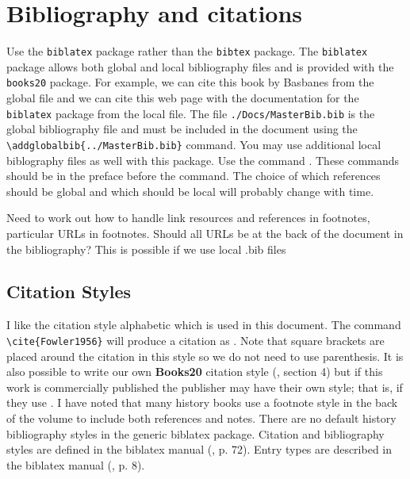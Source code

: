 

\section{Bibliography and citations}

Use the \texttt{biblatex} package \cite{Kime2019} rather than the
\texttt{bibtex} package. The \texttt{biblatex} package allows both
global and local bibliography files and is provided with the
\texttt{books20} package.  For example, we can cite this book by
Basbanes \cite{Basbanes2003} from the global file and we can cite this
web page with the documentation for the \texttt{biblatex} package
\cite{Lehman2018} from the local file. The file
\texttt{./Docs/MasterBib.bib} is the global bibliography file and must
be included in the document using the
\verb|\addglobalbib{../MasterBib.bib}| command. You may use additional
local biblography files as well with this package. Use the command
\verb||. These commands should be in the
preface before the \verb|| command. The choice of
which references should be global and which should be local will
probably change with time.
  
Need to work out how to handle link resources and references in
footnotes, particular URLs in footnotes. Should all URLs be at the
back of the document in the bibliography?  This is possible if we use
local .bib files

\subsection{Citation Styles}

I like the citation style {\ttfamily alphabetic} which is used in this
document. The command \verb|\cite{Fowler1956}| will produce a citation
as \cite{Fowler1956}. Note that square brackets are placed around the
citation in this style so we do not need to use parenthesis. It is
also possible to write our own {\bfseries Books20} citation style
(\cite{Kime2019}, section 4) but if this work is commercially
published the publisher may have their own style; that is, if they use
\LaTeXe.  I have noted that many history books use a footnote style in
the back of the volume to include both references and notes. There are
no default history bibliography styles in the generic {\ttfamily
  biblatex} package. Citation and bibliography styles are defined in
the {\ttfamily biblatex} manual (\cite{Kime2019}, p. 72).  Entry types
are described in the {\ttfamily biblatex} manual (\cite{Kime2019},
p. 8).

